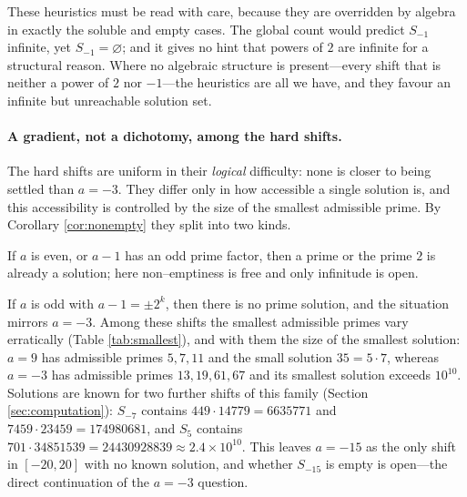 \documentclass[11pt,reqno]{amsart}
\theoremstyle{plain}
\theoremstyle{definition}
\theoremstyle{remark}
\begin{document}
These heuristics must be read with care, because they are overridden by algebra in exactly the soluble and empty cases. The global count would predict $S_{-1}$ infinite, yet $S_{-1}=\varnothing$; and it gives no hint that powers of $2$ are infinite for a structural reason. Where no algebraic structure is present---every shift that is neither a power of $2$ nor $-1$---the heuristics are all we have, and they favour an infinite but unreachable solution set.

\paragraph{A gradient, not a dichotomy, among the hard shifts.} The hard shifts are uniform in their \emph{logical} difficulty: none is closer to being settled than $a=-3$. They differ only in how accessible a single solution is, and this accessibility is controlled by the size of the smallest admissible prime. By Corollary \ref{cor:nonempty} they split into two kinds.

If $a$ is even, or $a-1$ has an odd prime factor, then a prime or the prime $2$ is already a solution; here non--emptiness is free and only infinitude is open.

If $a$ is odd with $a-1=\pm2^{k}$, then there is no prime solution, and the situation mirrors $a=-3$. Among these shifts the smallest admissible primes vary erratically (Table \ref{tab:smallest}), and with them the size of the smallest solution: $a=9$ has admissible primes $5,7,11$ and the small solution $35=5\cdot7$, whereas $a=-3$ has admissible primes $13,19,61,67$ and its smallest solution exceeds $10^{10}$. Solutions are known for two further shifts of this family (Section \ref{sec:computation}): $S_{-7}$ contains $449\cdot14779=6635771$ and $7459\cdot23459=174980681$, and $S_5$ contains $701\cdot34851539=24430928839\approx2.4\times10^{10}$. This leaves $a=-15$ as the only shift in $[-20,20]$ with no known solution, and whether $S_{-15}$ is empty is open---the direct continuation of the $a=-3$ question.
\end{document}
